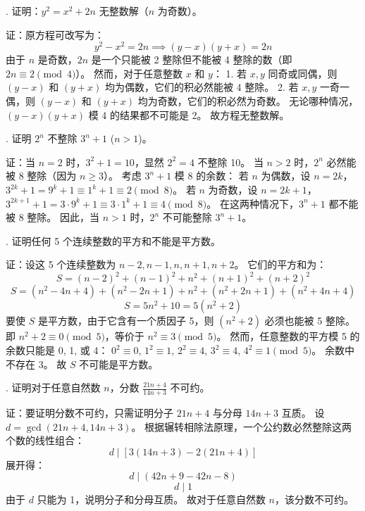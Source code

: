 \begin{questions}
. 证明：$y^2 = x^2 + 2n$ 无整数解（$n$ 为奇数）。

\begin{solution}
证：原方程可改写为：
\[
y^2 - x^2 = 2n \implies (y-x)(y+x) = 2n
\]
由于 $n$ 是奇数，$2n$ 是一个只能被 2 整除但不能被 4 整除的数（即 $2n \equiv 2 \pmod 4$）。
然而，对于任意整数 $x$ 和 $y$：
1. 若 $x, y$ 同奇或同偶，则 $(y-x)$ 和 $(y+x)$ 均为偶数，它们的积必然能被 4 整除。
2. 若 $x, y$ 一奇一偶，则 $(y-x)$ 和 $(y+x)$ 均为奇数，它们的积必然为奇数。
无论哪种情况，$(y-x)(y+x)$ 模 4 的结果都不可能是 2。
故方程无整数解。
\end{solution}

. 证明 $2^n$ 不整除 $3^n + 1$ ($n > 1$)。

\begin{solution}
证：当 $n=2$ 时，$3^2+1=10$，显然 $2^2=4$ 不整除 10。
当 $n > 2$ 时，$2^n$ 必然能被 8 整除（因为 $n \geq 3$）。
考虑 $3^n + 1$ 模 8 的余数：
若 $n$ 为偶数，设 $n = 2k$，$3^{2k} + 1 = 9^k + 1 \equiv 1^k + 1 \equiv 2 \pmod 8$。
若 $n$ 为奇数，设 $n = 2k+1$，$3^{2k+1} + 1 = 3 \cdot 9^k + 1 \equiv 3 \cdot 1^k + 1 \equiv 4 \pmod 8$。
在这两种情况下，$3^n + 1$ 都不能被 8 整除。
因此，当 $n > 1$ 时，$2^n$ 不可能整除 $3^n + 1$。
\end{solution}

. 证明任何 5 个连续整数的平方和不能是平方数。

\begin{solution}
证：设这 5 个连续整数为 $n-2, n-1, n, n+1, n+2$。
它们的平方和为：
\[
S = (n-2)^2 + (n-1)^2 + n^2 + (n+1)^2 + (n+2)^2
\]
\[
S = (n^2 - 4n + 4) + (n^2 - 2n + 1) + n^2 + (n^2 + 2n + 1) + (n^2 + 4n + 4)
\]
\[
S = 5n^2 + 10 = 5(n^2 + 2)
\]
要使 $S$ 是平方数，由于它含有一个质因子 5，则 $(n^2 + 2)$ 必须也能被 5 整除。
即 $n^2 + 2 \equiv 0 \pmod 5$，等价于 $n^2 \equiv 3 \pmod 5$。
然而，任意整数的平方模 5 的余数只能是 0, 1, 或 4：
$0^2 \equiv 0$, $1^2 \equiv 1$, $2^2 \equiv 4$, $3^2 \equiv 4$, $4^2 \equiv 1 \pmod 5$。
余数中不存在 3。
故 $S$ 不可能是平方数。
\end{solution}

. 证明对于任意自然数 $n$，分数 $\frac{21n+4}{14n+3}$ 不可约。

\begin{solution}
证：要证明分数不可约，只需证明分子 $21n+4$ 与分母 $14n+3$ 互质。
设 $d = \gcd(21n+4, 14n+3)$。
根据辗转相除法原理，一个公约数必然整除这两个数的线性组合：
\[
d \mid [3(14n+3) - 2(21n+4)]
\]
展开得：
\[
d \mid (42n + 9 - 42n - 8)
\]
\[
d \mid 1
\]
由于 $d$ 只能为 1，说明分子和分母互质。
故对于任意自然数 $n$，该分数不可约。
\end{solution}


\end{questions}
